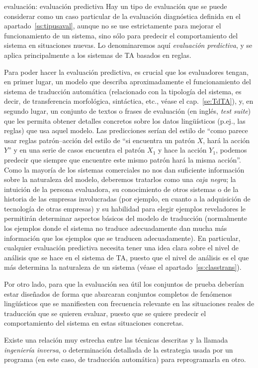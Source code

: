 \begin{persabermes}{evaluación: evaluación predictiva} Hay un tipo de evaluación que se puede considerar como un caso particular de la evaluación diagnóstica definida en el apartado~\ref{ss:tipusaval}, aunque no se use estrictamente para mejorar el funcionamiento de un sistema, sino sólo para predecir el comportamiento del sistema en situaciones nuevas. Lo denominaremos aquí \emph{evaluación predictiva}, y se aplica principalmente a los sistemas de TA basados en reglas. 

Para poder hacer la evaluación predictiva, es crucial que los evaluadores tengan, en primer lugar, un modelo que describa aproximadamente el funcionamiento del sistema de traducción automática (relacionado con la tipología del sistema, es decir, de transferencia morfológica, sintáctica, etc., véase el cap.~\ref{se:TdTA}), y, en segundo lugar, un conjunto de textos o frases de evaluación (en inglés, \emph{test suite}) que les permita obtener detalles concretos sobre los datos lingüísticos (p.ej., las reglas) que usa aquel modelo. Las predicciones serían del estilo de ``como parece usar reglas patrón--acción del estilo de ``si encuentra un patrón $X$, hará la acción $Y$'' y en una serie de casos encuentra el patrón $X_1$ y hace la acción $Y_1$, podemos predecir que siempre que encuentre este mismo patrón hará la misma acción''. Como la mayoría de los sistemas comerciales no nos dan suficiente información sobre la naturaleza del modelo, deberemos tratarlos como una \emph{caja negra}; la intuición de la persona evaluadora, su conocimiento de otros sistemas o de la historia de las empresas involucradas (por ejemplo, en cuanto a la adquisición de tecnología de otras empresas) y su habilidad para elegir ejemplos reveladores le permitirán determinar aspectos básicos del modelo de traducción (normalmente los ejemplos donde el sistema no traduce adecuadamente dan mucha más información que los ejemplos que se traducen adecuadamente). En particular, cualquier evaluación predictiva necesita tener una idea clara sobre el nivel de análisis que se hace en el sistema de TA, puesto que el nivel de análisis es el que más determina la naturaleza de un sistema (véase el apartado~\ref{ss:classtrans}). 

Por otro lado, para que la evaluación sea útil los conjuntos de prueba deberían estar diseñados de forma que abarcaran conjuntos completos de fenómenos lingüísticos que se manifiesten con frecuencia relevante en las situaciones reales de traducción que se quieren evaluar, puesto que se quiere predecir el comportamiento del sistema en estas situaciones concretas. 

Existe una relación muy estrecha entre las técnicas descritas y la llamada \emph{ingeniería inversa}, o determinación detallada de la estrategia usada por un programa (en este caso, de traducción automática) para reprogramarla en otro. \end{persabermes} 


